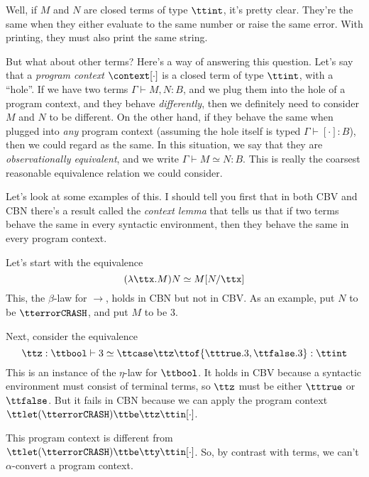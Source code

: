 \documentclass[runningheads,12pt]{llncs}
\begin{document}
Well, if $M$ and $N$ are closed terms of type $\ttint$, it's pretty clear.  They're the same when they either evaluate to the same number or raise the same error.  With printing, they must also print the same string.  

But what about other terms?  Here's a way of answering this question.  Let's say that a \emph{program context} $\context[\cdot]$ is a closed term of type $\ttint$, with a ``hole''.   If we have two terms $\Gamma \vdash M, N : B$, and we plug them into the hole of a program context, and they behave \emph{differently}, then we definitely need to consider $M$ and $N$ to be different.   On the other hand, if they behave the same when plugged into \emph{any} program context (assuming the hole itself is typed $\Gamma \vdash [\cdot] : B$), then we could regard as the same.  In this situation, we say that they are \emph{observationally equivalent}, and we write $\Gamma \vdash M \simeq N : B$.  This is really the coarsest reasonable equivalence relation we could consider.

Let's look at some examples of this.  I should tell you first that in both CBV and CBN there's a result called the \emph{context lemma} that tells us that if two terms behave the same in every syntactic environment, then they behave the same in every program context.  

Let's start with the equivalence
\begin{displaymath}
  (\lambda \ttx. M) N \simeq M[N/\ttx]
\end{displaymath}
This, the $\beta$-law for $\rightarrow$, holds in CBN but not in CBV.  As an example, put $N$ to be $\tterror \mathtt{CRASH}$, and put $M$ to be 3.  

Next, consider the equivalence
\begin{displaymath}
 \ttz:\ttbool \vdash 3 \simeq \ttcase \ttz \ttof \{ \tttrue. 3, \ttfalse. 3 \}  : \ttint
\end{displaymath}
This is an instance of the $\eta$-law for $\ttbool$.   It holds in CBV because a syntactic environment must consist of terminal terms, so $\ttz$ must be either $\tttrue$ or $\ttfalse$.  But it fails in CBN because we can apply the program context $\ttlet (\tterror \mathtt{CRASH}) \ttbe \ttz \ttin [\cdot]$.

\begin{remark}
This program context is different from  $\ttlet (\tterror \mathtt{CRASH}) \ttbe \tty \ttin [\cdot]$.   So, by contrast with terms, we can't $\alpha$-convert a program context.  
\end{remark}
\end{document}
